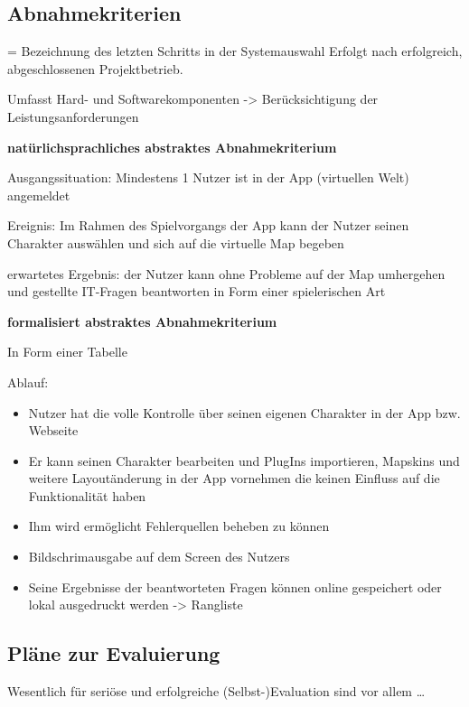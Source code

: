 \subsection{Abnahmekriterien}


= Bezeichnung des letzten Schritts in der Systemauswahl
Erfolgt nach erfolgreich, abgeschlossenen Projektbetrieb.

Umfasst Hard- und Softwarekomponenten -> Berücksichtigung der Leistungsanforderungen

\textbf {natürlichsprachliches abstraktes Abnahmekriterium}

Ausgangssituation:
Mindestens 1 Nutzer ist in der App (virtuellen Welt) angemeldet

Ereignis:
Im Rahmen des Spielvorgangs der App kann der Nutzer seinen Charakter auswählen und sich auf die virtuelle Map begeben

erwartetes Ergebnis:
der Nutzer kann ohne Probleme auf der Map umhergehen und gestellte IT-Fragen beantworten in Form einer spielerischen Art


\textbf {formalisiert abstraktes Abnahmekriterium}

In Form einer Tabelle

Ablauf:

\begin{itemize}
	\item Nutzer hat die volle Kontrolle über seinen eigenen Charakter in der App bzw. Webseite

	\item Er kann seinen Charakter bearbeiten und PlugIns importieren, Mapskins und weitere Layoutänderung in der App vornehmen die       keinen Einfluss auf die Funktionalität haben
		
	\item Ihm wird ermöglicht Fehlerquellen beheben zu können 

	\item Bildschrimausgabe auf dem Screen des Nutzers
	
	\item Seine Ergebnisse der beantworteten Fragen können online
	gespeichert oder lokal ausgedruckt werden -> Rangliste 
		 
\end{itemize}

\subsection{Pläne zur Evaluierung}


Wesentlich für seriöse und erfolgreiche (Selbst-)Evaluation sind vor allem …



